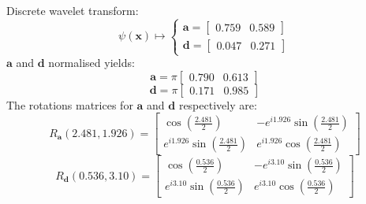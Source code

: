Discrete wavelet transform:
% 
\begin{equation}
    \psi(\textbf{x})
    \mapsto
    \begin{cases}
        \textbf{a} =
            \begin{bmatrix}0.759 & 0.589 \end{bmatrix} \\
        \textbf{d} =
            \begin{bmatrix}0.047 & 0.271\end{bmatrix}
    \end{cases}
\end{equation}
% 
$\textbf{a}$ and $\textbf{d}$ normalised yields:
\begin{equation}
    \textbf{a} =
        \pi\begin{bmatrix}0.790 & 0.613\end{bmatrix}
\end{equation}
\begin{equation}
    \textbf{d} =
        \pi\begin{bmatrix}0.171 & 0.985\end{bmatrix}
\end{equation}
%
The rotations matrices for $\textbf{a}$ and $\textbf{d}$ respectively are:
\begin{equation}
R_{\textbf{a}}(2.481, 1.926) = 
\begin{bmatrix}
\cos(\frac{2.481}{2}) & -e^{i1.926}\sin(\frac{2.481}{2}) \\
e^{i1.926}\sin(\frac{2.481}{2}) & e^{i1.926}\cos(\frac{2.481}{2})
\end{bmatrix}
\end{equation}
\begin{equation}
R_{\textbf{d}}(0.536, 3.10) = 
\begin{bmatrix}
\cos(\frac{0.536}{2}) & -e^{i3.10}\sin(\frac{0.536}{2}) \\
e^{i3.10}\sin(\frac{0.536}{2}) & e^{i3.10}\cos(\frac{0.536}{2})
\end{bmatrix}
\end{equation}

